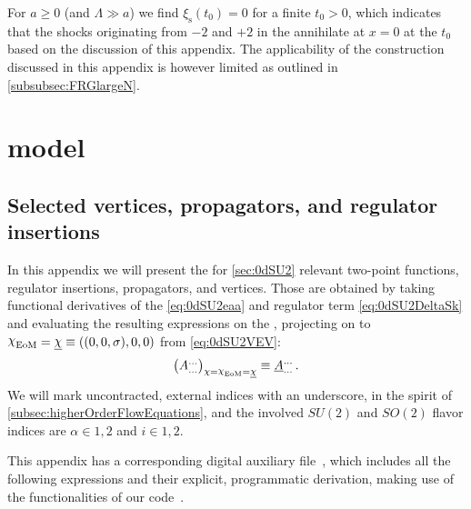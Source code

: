 For $a\geq 0$ (and $\Lambda\gg a$) we find $\xi_\mathrm{s} ( t_0 ) = 0$ for a finite $t_0 > 0$, which indicates that the shocks originating from $-2$ and $+2$ in the \uv{} annihilate at $x=0$ at the \rgtime{} $t_0$ based on the discussion of this appendix. The applicability of the construction discussed in this appendix is however limited as outlined in \cref{subsubsec:FRGlargeN}.

\section{ model}
\subsection{Selected vertices, propagators, and regulator insertions}\label{app:SU2FSelements}
\renewcommand{\FSk}{t}
In this appendix we will present the for \cref{sec:0dSU2} relevant two-point functions, regulator insertions, propagators, and vertices. 
Those are obtained by taking functional derivatives of the \eaa{} \eqref{eq:0dSU2eaa} and regulator term \eqref{eq:0dSU2DeltaSk} and evaluating the resulting expressions on the 
\qeom{}, \viz{} projecting on to $\FSsfEoM{}=\MFEchi{}\equiv((0,0,\sigma),0,0)$ from \cref{eq:0dSU2VEV}:
\begin{align}
\big(A_{\ldots}^{\ldots}\big)_{\chi=\FSsfEoM{}=\MFEchi{}}\equiv \underline{A}_{\ldots}^{\ldots}\,.
\end{align}
We will mark uncontracted, external indices with an underscore, in the spirit of \cref{subsec:higherOrderFlowEquations}, and the involved $SU(2)$ and $SO(2)$ flavor indices are $\alpha\in{1,2}$ and 
$i\in{1,2}$.

This appendix has a corresponding digital auxiliary file~\cite{Steil:2023zeroDSU2}, which includes all the following expressions and their explicit, programmatic derivation, making use of the functionalities of our \WAM{} code~\cite{Steil:2023PhDFlowEquationsNB}.\bigskip

